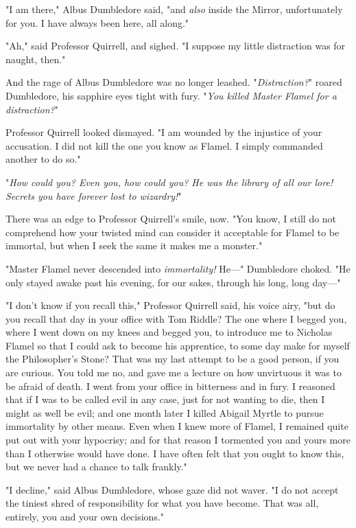 "I am there," Albus Dumbledore said, "and \emph{also} inside the Mirror,
unfortunately for you. I have always been here, all along."

"Ah," said Professor Quirrell, and sighed. "I suppose my little distraction was
for naught, then."

And the rage of Albus Dumbledore was no longer leashed. "\emph{Distraction?}"
roared Dumbledore, his sapphire eyes tight with fury. "\emph{You killed Master
Flamel for a distraction?}"

Professor Quirrell looked dismayed. "I am wounded by the injustice of your
accusation. I did not kill the one you know as Flamel. I simply commanded
another to do so."

"\emph{How could you? Even you, how could you? He was the library of all our
lore! Secrets you have forever lost to wizardry!}"

There was an edge to Professor Quirrell's smile, now. "You know, I still do not
comprehend how your twisted mind can consider it acceptable for Flamel to be
immortal, but when I seek the same it makes me a monster."

"Master Flamel never descended into \emph{immortality!} He---" Dumbledore
choked. "He only stayed awake past his evening, for our sakes, through his
long, long day---"

"I don't know if you recall this," Professor Quirrell said, his voice airy,
"but do you recall that day in your office with Tom Riddle? The one where I
begged you, where I went down on my knees and begged you, to introduce me to
Nicholas Flamel so that I could ask to become his apprentice, to some day make
for myself the Philosopher's Stone? That was my last attempt to be a good
person, if you are curious. You told me no, and gave me a lecture on how
unvirtuous it was to be afraid of death. I went from your office in bitterness
and in fury. I reasoned that if I was to be called evil in any case, just for
not wanting to die, then I might as well be evil; and one month later I killed
Abigail Myrtle to pursue immortality by other means. Even when I knew more of
Flamel, I remained quite put out with your hypocrisy; and for that reason I
tormented you and yours more than I otherwise would have done. I have often
felt that you ought to know this, but we never had a chance to talk frankly."

"I decline," said Albus Dumbledore, whose gaze did not waver. "I do not accept
the tiniest shred of responsibility for what you have become. That was all,
entirely, you and your own decisions."

